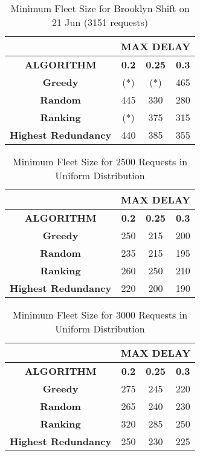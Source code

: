 \documentclass[urop]{socreport}
\begin{document}
\begin{table}[h!]
    \centering
    \begin{tabular}{|c|c|c|c|}
        \hline
         & \multicolumn{3}{|c|}{\textbf{MAX DELAY}}\\
         \hline
         \textbf{ALGORITHM} & \textbf{0.2} & \textbf{0.25}& \textbf{0.3}\\
         \hline \hline
         \textbf{Greedy} & (*) & (*) & 465\\
         \hline
         \textbf{Random} & 445 & 330 & 280\\
         \hline
         \textbf{Ranking} & (*) & 375 & 315\\
         \hline
         \textbf{Highest Redundancy} & 440 & 385 & 355\\
        \hline
    \end{tabular}
    \caption{Minimum Fleet Size for Brooklyn Shift on 21 Jun (3151 requests)}
    \label{tab:exp2_2106}
\end{table}



\begin{table}[h!]
    \centering
    \begin{tabular}{|c|c|c|c|}
        \hline
         & \multicolumn{3}{|c|}{\textbf{MAX DELAY}}\\
         \hline
         \textbf{ALGORITHM} & \textbf{0.2} & \textbf{0.25}& \textbf{0.3}\\
         \hline \hline
         \textbf{Greedy} & 250 & 215 & 200\\
         \hline
         \textbf{Random} & 235 & 215& 195\\
         \hline
         \textbf{Ranking} & 260 & 250 & 210\\
         \hline
         \textbf{Highest Redundancy} & 220 & 200 & 190\\
        \hline
    \end{tabular}
    \caption{Minimum Fleet Size for 2500 Requests in Uniform Distribution}
    \label{tab:exp3_unif2500}
\end{table}

\begin{table}[h!]
    \centering
    \begin{tabular}{|c|c|c|c|}
        \hline
         & \multicolumn{3}{|c|}{\textbf{MAX DELAY}}\\
         \hline
         \textbf{ALGORITHM} & \textbf{0.2} & \textbf{0.25}& \textbf{0.3}\\
         \hline \hline
         \textbf{Greedy} & 275 & 245 & 220\\
         \hline
         \textbf{Random} & 265 & 240& 230\\
         \hline
         \textbf{Ranking} & 320 & 285 & 250\\
         \hline
         \textbf{Highest Redundancy} & 250 & 230 & 225\\
        \hline
    \end{tabular}
    \caption{Minimum Fleet Size for 3000 Requests in Uniform Distribution}
    \label{tab:exp3_unif3000}
\end{table}
\end{document}
